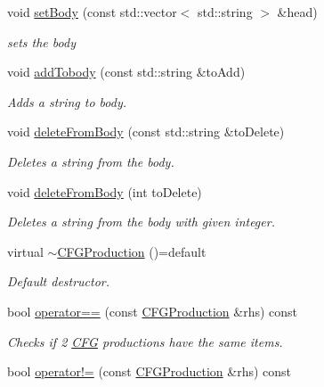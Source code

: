 \begin{DoxyCompactItemize}
void \hyperlink{classCFGProduction_a40047c89f0959a9282e84413f01ce876}{set\+Body} (const std\+::vector$<$ std\+::string $>$ \&head)
\begin{DoxyCompactList}\small\item\em sets the body \end{DoxyCompactList}\item 
void \hyperlink{classCFGProduction_a5e4960e3b31387a1ffda43af338d9d62}{add\+Tobody} (const std\+::string \&to\+Add)
\begin{DoxyCompactList}\small\item\em Adds a string to body. \end{DoxyCompactList}\item 
void \hyperlink{classCFGProduction_a41772dfd4bf4811a91cf6730a0218eb3}{delete\+From\+Body} (const std\+::string \&to\+Delete)
\begin{DoxyCompactList}\small\item\em Deletes a string from the body. \end{DoxyCompactList}\item 
void \hyperlink{classCFGProduction_a8f6f3da60808ca63e8c847a9d7b63261}{delete\+From\+Body} (int to\+Delete)
\begin{DoxyCompactList}\small\item\em Deletes a string from the body with given integer. \end{DoxyCompactList}\item 
\mbox{\label{classCFGProduction_a006330342295eb8f34633820d3c0e9b0}} 
virtual \hyperlink{classCFGProduction_a006330342295eb8f34633820d3c0e9b0}{$\sim$\+C\+F\+G\+Production} ()=default
\begin{DoxyCompactList}\small\item\em Default destructor. \end{DoxyCompactList}\item 
bool \hyperlink{classCFGProduction_a5d8151c008e1231e5ed6fae6deacab0d}{operator==} (const \hyperlink{classCFGProduction}{C\+F\+G\+Production} \&rhs) const
\begin{DoxyCompactList}\small\item\em Checks if 2 \hyperlink{classCFG}{C\+FG} productions have the same items. \end{DoxyCompactList}\item 
bool \hyperlink{classCFGProduction_ae77d1957395260e4ae310b2d0d738a36}{operator!=} (const \hyperlink{classCFGProduction}{C\+F\+G\+Production} \&rhs) const

\end{DoxyCompactItemize}
